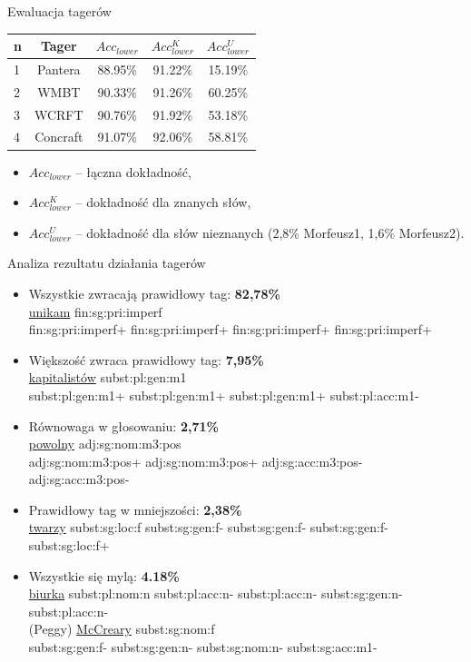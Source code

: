 \documentclass[xcolor=dvipsnames,polish]{beamer}
\newcommand{\marked}[1]{{\bf #1}}
\begin{document}
\begin{frame}{Ewaluacja tagerów}
\begin{center}
\begin{tabular}{lcccc} \hline
n & Tager 		& $Acc_{lower}$	& $Acc^K_{lower}$	& $Acc^U_{lower}$	\\ \hline
1 & Pantera   & 88.95\%   & 91.22\% & 15.19\% \\
2 & WMBT	 	& 90.33\%		& 91.26\%	& 60.25\%	\\
3 & WCRFT	 	& 90.76\%		& 91.92\%	& 53.18\%	\\
4 & Concraft	& 91.07\%		& 92.06\%	& 58.81\%	\\
\end{tabular}
\end{center}
\begin{itemize}
\item $Acc_{lower}$ -- łączna dokładność,
\item $Acc^K_{lower}$ -- dokładność dla znanych słów,
\item $Acc^U_{lower}$ -- dokładność dla słów nieznanych (2,8\% Morfeusz1, 1,6\% Morfeusz2).
\end{itemize}
\end{frame}

\begin{frame}{Analiza rezultatu działania tagerów}
\begin{itemize}
\item Wszystkie zwracają prawidłowy tag: \marked{82,78\%} \\
{\footnotesize \underline{unikam} fin:sg:pri:imperf\\
fin:sg:pri:imperf+ fin:sg:pri:imperf+ fin:sg:pri:imperf+ fin:sg:pri:imperf+}
\item Większość zwraca prawidłowy tag: \marked{7,95\%} \\
{\footnotesize \underline{kapitalistów} subst:pl:gen:m1 \\
subst:pl:gen:m1+ subst:pl:gen:m1+ subst:pl:gen:m1+ subst:pl:acc:m1-}
\item Równowaga w głosowaniu: \marked{2,71\%} \\
{\footnotesize \underline{powolny} adj:sg:nom:m3:pos \\
adj:sg:nom:m3:pos+ adj:sg:nom:m3:pos+ adj:sg:acc:m3:pos- adj:sg:acc:m3:pos-}
\item Prawidłowy tag w mniejszości: \marked{2,38\%} \\
{\footnotesize \underline{twarzy} subst:sg:loc:f subst:sg:gen:f- subst:sg:gen:f- subst:sg:gen:f- subst:sg:loc:f+}
\item Wszystkie się mylą: \marked{4.18\%} \\
{\footnotesize \underline{biurka} subst:pl:nom:n subst:pl:acc:n- subst:pl:acc:n- subst:sg:gen:n- subst:pl:acc:n- \\
(Peggy) \underline{McCreary} subst:sg:nom:f \\
subst:sg:gen:f- subst:sg:gen:n- subst:sg:nom:n- subst:sg:acc:m1-}
\end{itemize}
\end{frame}
\end{document}
